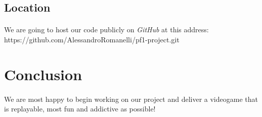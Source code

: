 \documentclass[a4paper]{article}
\begin{document}
\subsection{Location}
  \paragraph{} We are going to host our code publicly on \emph{GitHub} at this address: \\ https://github.com/AlessandroRomanelli/pf1-project.git

\section{Conclusion}
\paragraph{} We are most happy to begin working on our project and deliver a videogame that is replayable, most fun and addictive as possible!
\end{document}
